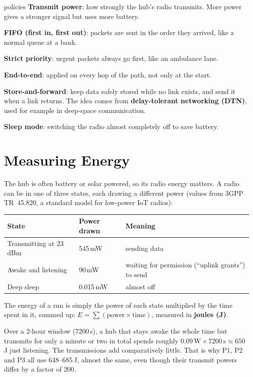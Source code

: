 \documentclass[11pt,a4paper]{article}
\newcommand{\kt}[1]{\textbf{\color{navy}#1}}
\begin{document}
\begin{term}{policies}
\kt{Transmit power}: how strongly the hub's radio transmits. More power gives a stronger signal but uses more battery.\par
\kt{FIFO (first in, first out)}: packets are sent in the order they arrived, like a normal queue at a bank.\par
\kt{Strict priority}: urgent packets always go first, like an ambulance lane.\par
\kt{End-to-end}: applied on every hop of the path, not only at the start.\par
\kt{Store-and-forward}: keep data safely stored while no link exists, and send it when a link returns. The idea comes from \kt{delay-tolerant networking (DTN)}, used for example in deep-space communication.\par
\kt{Sleep mode}: switching the radio almost completely off to save battery.
\end{term}

\section{Measuring Energy}

The hub is often battery or solar powered, so its radio energy matters. A radio can be in one of three states, each drawing a different power (values from 3GPP TR~45.820, a standard model for low-power IoT radios):

\begin{center}
\small
\begin{tabular}{@{}lll@{}}
\toprule
State & Power drawn & Meaning \\
\midrule
Transmitting at 23\,dBm & 545\,mW & sending data \\
Awake and listening & 90\,mW & waiting for permission (``uplink grants'') to send \\
Deep sleep & 0.015\,mW & almost off \\
\bottomrule
\end{tabular}
\end{center}

The energy of a run is simply the power of each state multiplied by the time spent in it, summed up: $E = \sum (\text{power} \times \text{time})$, measured in \kt{joules (J)}.

\begin{example}
Over a 2-hour window (7200\,s), a hub that stays awake the whole time but transmits for only a minute or two in total spends roughly $0.09\,\text{W} \times 7200\,\text{s} \approx 650$\,J just listening. The transmissions add comparatively little. That is why P1, P2 and P3 all use 648--685\,J, almost the same, even though their transmit powers differ by a factor of 200.
\end{example}
\end{document}
